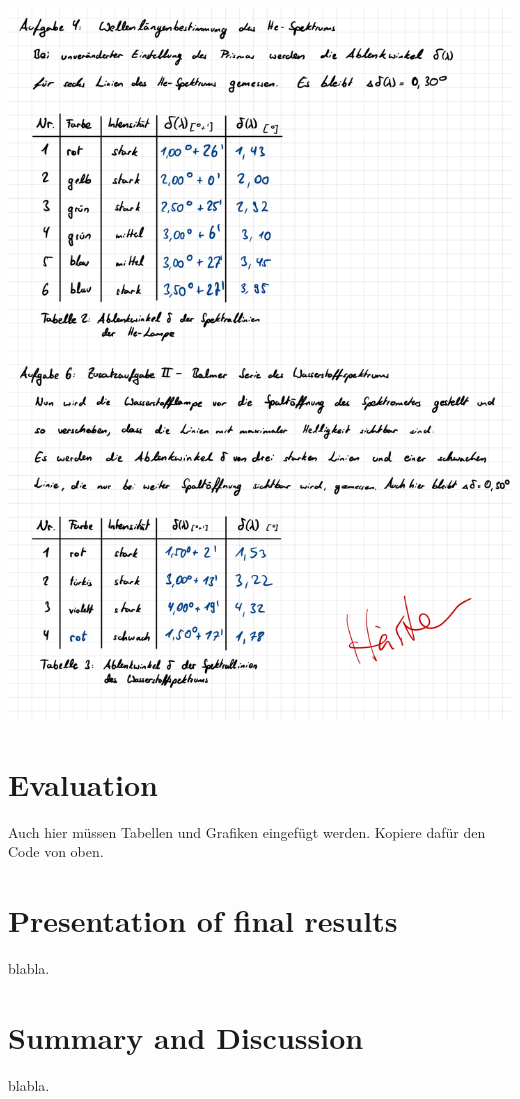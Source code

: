 \documentclass{article}
\begin{document}
\includegraphics[width=\textwidth]{graphics/mess3.jpg}
\newpage

\addtocounter{table}{3}

\section{Evaluation}

Auch hier müssen Tabellen und Grafiken eingefügt werden. Kopiere dafür den Code von oben.

\section{Presentation of final results}

blabla.

\section{Summary and Discussion}

blabla.
\end{document}
